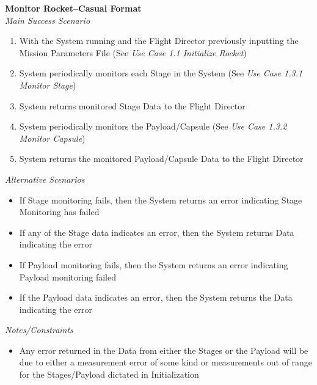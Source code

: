 \documentclass[letterpaper]{article}
\begin{document}
\noindent
\textbf{Monitor Rocket--Casual Format}\\
\textit{Main Success Scenario}\\
\begin{enumerate}
   \item With the System running and the Flight Director previously
      inputting the Mission Parameters File (See \textit{Use Case 1.1
      Initialize Rocket})
   \item System periodically monitors each Stage in the System (See
      \textit{Use Case 1.3.1 Monitor Stage})
   \item System returns monitored Stage Data to the Flight Director
   \item System periodically monitors the Payload/Capsule (See
      \textit{Use Case 1.3.2 Monitor Capsule})
   \item System returns the monitored Payload/Capsule Data to the
      Flight Director
\end{enumerate}
\textit{Alternative Scenarios}
\begin{itemize}
   \item[2a.]If Stage monitoring fails, then the System returns an
      error indicating Stage Monitoring has failed
   \item[3a.]If any of the Stage data indicates an error, then
      the System returns Data indicating the error
   \item[4a.]If Payload monitoring fails, then the System returns an
      error indicating Payload monitoring failed
   \item[5a.]If the Payload data indicates an error, then the System
      returns the Data indicating the error
\end{itemize}
\textit{Notes/Constraints}
\begin{itemize}
   \item[*]Any error returned in the Data from either the Stages or
      the Payload will be due to either a measurement error of some
      kind or measurements out of range for the Stages/Payload 
      dictated in Initialization
\end{itemize}
\end{document}
